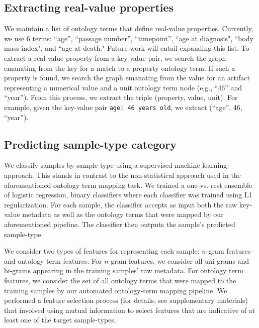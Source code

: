 \subsection{Extracting real-value properties}
We maintain a list of ontology terms that define real-value properties. Currently, we use 6 terms: ``age'', ``passage number'', ``timepoint'', ``age at diagnosis", ``body mass index", and ``age at death."  Future work will entail expanding this list.  To extract a real-value property from a key-value pair, we search the graph emanating from the key for a match to a property ontology term.  If such a property is found, we search the graph emanating from the value for an artifact representing a numerical value and a unit ontology term node (e.g., ``46'' and ``year'').  From this process, we extract the triple (property, value, unit). For example, given the key-value pair \texttt{age: 46 years old}, we extract (``age'', 46, ``year'').

\subsection{Predicting sample-type category}\label{prediction_sample_type}

We classify samples by sample-type using a supervised machine learning approach.  This stands in contrast to the non-statistical approach used in the aforementioned ontology term mapping task. We trained a one-vs.-rest ensemble of logistic regression, binary classifiers  
where each classifier was trained using L1 regularization.  For each sample, the classifier accepts as input both the raw key-value metadata as well as the ontology terms that were mapped by our aforementioned pipeline.  The classifier then outputs the sample's predicted sample-type.

We consider two types of features for representing each sample: $n$-gram features and ontology term features.  For $n$-gram features, we consider all uni-grams and bi-grams appearing in the training samples' raw metadata.  For ontology term features, we consider the set of all ontology terms that were mapped to the training samples by our automated ontology-term mapping pipeline.  We performed a feature selection process (for details, see supplementary materials) that involved using mutual information to select features that are indicative of at least one of the target sample-types. 

